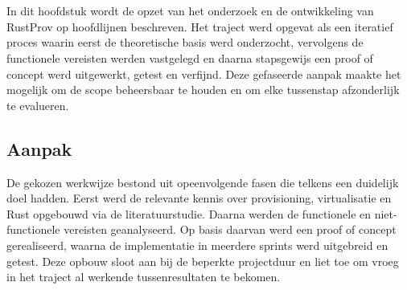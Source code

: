 
\chapter{}%
\label{ch:methodologie}





In dit hoofdstuk wordt de opzet van het onderzoek en de ontwikkeling van RustProv op hoofdlijnen beschreven. Het traject werd opgevat als een iteratief proces waarin eerst de theoretische basis werd onderzocht, vervolgens de functionele vereisten werden vastgelegd en daarna stapsgewijs een proof of concept werd uitgewerkt, getest en verfijnd. Deze gefaseerde aanpak maakte het mogelijk om de scope beheersbaar te houden en om elke tussenstap afzonderlijk te evalueren. 

\section{Aanpak}

De gekozen werkwijze bestond uit opeenvolgende fasen die telkens een duidelijk doel hadden. Eerst werd de relevante kennis over provisioning, virtualisatie en Rust opgebouwd via de literatuurstudie. Daarna werden de functionele en niet-functionele vereisten geanalyseerd. Op basis daarvan werd een proof of concept gerealiseerd, waarna de implementatie in meerdere sprints werd uitgebreid en getest. Deze opbouw sloot aan bij de beperkte projectduur en liet toe om vroeg in het traject al werkende tussenresultaten te bekomen. 

